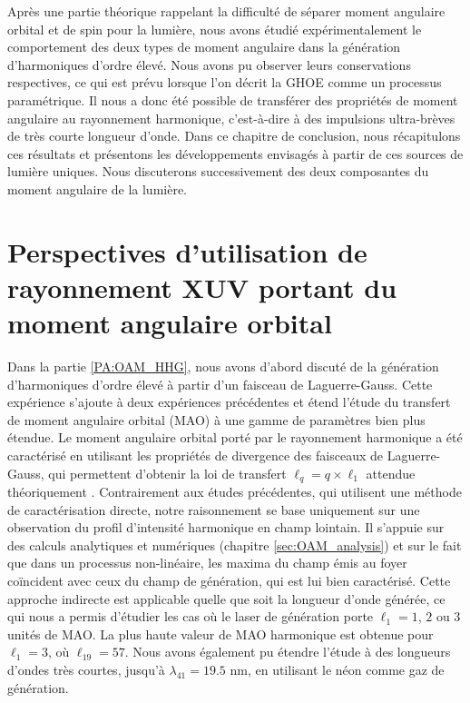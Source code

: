 \cleardoublepage
\renewcommand{\thesection}{\Roman{section}}
\setcounter{section}{0}
\renewcommand{\theHsection}{CL.\the\value{section}}
\renewcommand{\thefigure}{\Roman{section}.\arabic{figure}}
\renewcommand{\theHfigure}{CL.\Roman{section}.\arabic{figure}}
\setcounter{figure}{0}

\makeatletter
\def\toclevel@chapter{-1}
\def\toclevel@section{0}
\def\toclevel@subsection{1}
\makeatother

Après une partie théorique rappelant la difficulté de séparer moment angulaire orbital et de spin pour la lumière, nous avons étudié expérimentalement le comportement des deux types de moment angulaire dans la génération d'harmoniques d'ordre élevé. Nous avons pu observer leurs conservations respectives, ce qui est prévu lorsque l'on décrit la GHOE comme un processus paramétrique. Il nous a donc été possible de transférer des propriétés de moment angulaire au rayonnement harmonique, c'est-à-dire à des impulsions ultra-brèves de très courte longueur d'onde. Dans ce chapitre de conclusion, nous récapitulons ces résultats et présentons les développements envisagés à partir de ces sources de lumière uniques. Nous discuterons successivement des deux composantes du moment angulaire de la lumière.

\section{Perspectives d'utilisation de rayonnement XUV portant du moment angulaire orbital}
Dans la partie \ref{PA:OAM_HHG}, nous avons d'abord discuté de la génération d'harmoniques d'ordre élevé à partir d'un faisceau de Laguerre-Gauss. Cette expérience s'ajoute à deux expériences précédentes  et étend l'étude du transfert de moment angulaire orbital (MAO) à une gamme de paramètres bien plus étendue. Le moment angulaire orbital porté par le rayonnement harmonique a été caractérisé en utilisant les propriétés de divergence des faisceaux de Laguerre-Gauss, qui permettent d'obtenir la loi de transfert $\ell_q=q\times\ell_1$ attendue théoriquement . Contrairement aux études précédentes, qui utilisent une méthode de caractérisation directe, notre raisonnement se base uniquement sur une observation du profil d'intensité harmonique en champ lointain. Il s'appuie sur des calculs analytiques et numériques (chapitre \ref{sec:OAM_analysis}) et sur le fait que dans un processus non-linéaire, les maxima du champ émis au foyer coïncident avec ceux du champ de génération, qui est lui bien caractérisé. Cette approche indirecte est applicable quelle que soit la longueur d'onde générée, ce qui nous a permis d'étudier les cas où le laser de génération porte $\ell_1=1$, $2$ ou $3$ unités de MAO. La plus haute valeur de MAO harmonique est obtenue pour $\ell_1=3$, où $\ell_{19} = 57$. Nous avons également pu étendre l'étude à des longueurs d'ondes très courtes, jusqu'à $\lambda_{41} = 19.5$ nm, en utilisant le néon comme gaz de génération.

